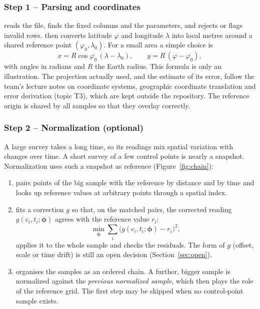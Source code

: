 \documentclass{article}
\begin{document}
\subsubsection*{Step 1 -- Parsing and coordinates}

 reads the file, finds the fixed columns and the
parameters, and rejects or flags invalid rows. 
then converts latitude $\varphi$ and longitude $\lambda$ into local metres
around a shared reference point $(\varphi_0,\lambda_0)$. For a small area a
simple choice is
\begin{equation*}
  x = R\cos\varphi_0\,(\lambda-\lambda_0), \qquad y = R\,(\varphi-\varphi_0),
\end{equation*}
with angles in radians and $R$ the Earth radius. This formula is only an
illustration. The projection actually used, and the estimate of its error,
follow the team's lecture notes on coordinate systems, geographic coordinate
translation and error derivation (topic T3), which are kept outside the
repository. The reference origin is shared by all samples so that they
overlay correctly.

\subsubsection*{Step 2 -- Normalization (optional)}

A large survey takes a long time, so its readings mix spatial variation with
changes over time. A short survey of a few control points is nearly a
snapshot. Normalization uses such a snapshot as reference
(Figure~\ref{fig:chain}):

\begin{enumerate}
\item {} pairs points of the big sample with the reference by
      distance and by time and looks up reference values at arbitrary points
      through a spatial index.
\item {} fits a correction $g$ so that, on the matched
      pairs, the corrected reading $g(c_i,t_i;\boldsymbol\phi)$ agrees with
      the reference value $r_i$:
      \begin{equation*}
        \min_{\boldsymbol\phi}\sum_i\bigl(g(c_i,t_i;\boldsymbol\phi)-r_i\bigr)^2 ,
      \end{equation*}
      applies it to the whole sample and checks the residuals. The form of
      $g$ (offset, scale or time drift) is still an open decision
      (Section~\ref{sec:open}).
\item {} organises the samples as an ordered chain. A further,
      bigger sample is normalized against the \emph{previous normalized
      sample}, which then plays the role of the reference grid. The first
      step may be skipped when no control-point sample exists.
\end{enumerate}
\end{document}

